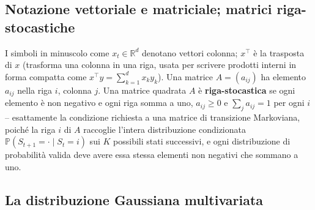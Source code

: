 \documentclass[11pt]{article}
\theoremstyle{definition}
\theoremstyle{remark}
\begin{document}
\subsection{Notazione vettoriale e matriciale; matrici riga-stocastiche}

I simboli in minuscolo come $x_t\in\mathbb{R}^d$ denotano vettori colonna; $x^\top$ \`e la trasposta di $x$ (trasforma una colonna in una riga, usata per scrivere prodotti interni in forma compatta come $x^\top y=\sum_{k=1}^d x_ky_k$). Una matrice $A=(a_{ij})$ ha elemento $a_{ij}$ nella riga $i$, colonna $j$. Una matrice quadrata $A$ \`e \textbf{riga-stocastica} se ogni elemento \`e non negativo e ogni riga somma a uno, $a_{ij}\ge0$ e $\sum_{j}a_{ij}=1$ per ogni $i$ -- esattamente la condizione richiesta a una matrice di transizione Markoviana, poich\'e la riga $i$ di $A$ raccoglie l'intera distribuzione condizionata $\mathbb{P}(S_{t+1}=\cdot\mid S_t=i)$ sui $K$ possibili stati successivi, e ogni distribuzione di probabilit\`a valida deve avere essa stessa elementi non negativi che sommano a uno.

\subsection{La distribuzione Gaussiana multivariata}
\label{sec:mvgauss}
\end{document}
